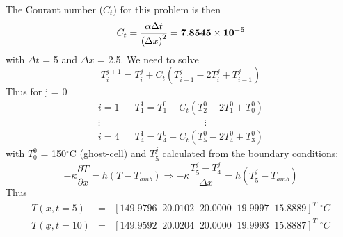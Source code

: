 \documentclass[calculator,steamtables,datasheet,solutions]{exam_newMarcus2}
\newcommand{\frc}{\displaystyle\frac}
\begin{document}
\begin{question}
\begin{enumerate}
{The Courant number ($C_{t}$) for this problem is then~
\begin{displaymath}
   C_{t} = \frc{\alpha \Delta t}{\left(\Delta x\right)^{2}} = {\bf 7.8545\times 10^{-5}}
\end{displaymath}
with $\Delta t$ = 5 and $\Delta x$ = 2.5. We need to solve
\begin{displaymath}
    T_{i}^{j+1} = T_{i}^{j} + C_{t}\left(T_{i+1}^{j}-2T_{i}^{j}+T_{i-1}^{j}\right)
\end{displaymath}
Thus for j = 0~
\begin{eqnarray}
    i=1 && T_{1}^{1} = T_{1}^{0} + C_{t}\left(T_{2}^{0}-2T_{1}^{0}+T_{0}^{0}\right) \nonumber \\
     \vdots && \hspace{3cm} \vdots \nonumber \\
    i=4 && T_{4}^{1} = T_{4}^{0} + C_{t}\left(T_{5}^{0}-2T_{4}^{0}+T_{3}^{0}\right) \nonumber
\end{eqnarray}
with $T_{0}^{0}$ = 150$^{\circ}$C (ghost-cell) and $T_{5}^{j}$ calculated from the boundary conditions:~
\begin{displaymath}
-\kappa\frc{\partial T}{\partial x} = h\left(T-T_{amb}\right)\Longrightarrow -\kappa \frc{T^{j}_{5}-T^{j}_{4}}{\Delta x} = h\left(T_{5}^{j}-T_{amb}\right)
\end{displaymath}
Thus~
{\bf \begin{eqnarray}
   T\left(\underline{x},t=5\right)  &=& \left[ 149.9796\;\; 20.0102 \;\; 20.0000\;\; 19.9997\;\; 15.8889\right]^{T}\; ^{\circ}C \nonumber \\
   T\left(\underline{x},t=10\right) &=& \left[ 149.9592\;\; 20.0204 \;\; 20.0000\;\; 19.9993\;\; 15.8887\right]^{T}\; ^{\circ}C \nonumber
\end{eqnarray}}
} 

\end{enumerate}

\end{question}


\clearpage
\end{document}

